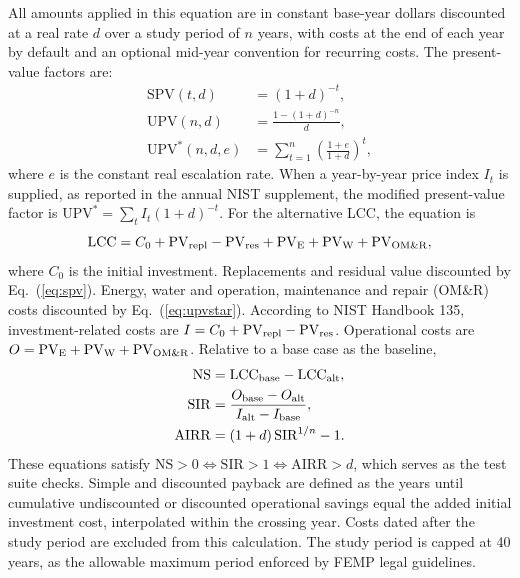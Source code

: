 \documentclass[10pt,twocolumn,letterpaper]{article}
\begin{document}
All amounts applied in this equation are in constant base-year dollars discounted at a real rate $d$ over a study period of $n$ years, with costs at the end of each year by default and an optional mid-year convention for recurring costs. The present-value factors are:
\begin{align}
\mathrm{SPV}(t,d) &= (1+d)^{-t}, \label{eq:spv}\\
\mathrm{UPV}(n,d) &= \frac{1-(1+d)^{-n}}{d}, \label{eq:upv}\\
\mathrm{UPV}^{*}(n,d,e) &= \sum_{t=1}^{n}\left(\frac{1+e}{1+d}\right)^{t}, \label{eq:upvstar}
\end{align}
where $e$ is the constant real escalation rate. When a year-by-year price index $I_t$ is supplied, as reported in the annual NIST supplement, the modified present-value factor is $\mathrm{UPV}^{*}=\sum_t I_t(1+d)^{-t}$. For the alternative LCC, the equation is
\begin{equation}
\mathrm{LCC} = C_0 + \mathrm{PV}_{\rm repl} - \mathrm{PV}_{\rm res} + \mathrm{PV}_{\rm E} + \mathrm{PV}_{\rm W} + \mathrm{PV}_{\rm OM\&R},
\label{eq:lcc}
\end{equation}
where $C_0$ is the initial investment. Replacements and residual value discounted by Eq.~(\ref{eq:spv}). Energy, water and operation, maintenance and repair (OM\&R) costs discounted by Eq.~(\ref{eq:upvstar}). According to NIST Handbook 135, investment-related costs are $I = C_0+\mathrm{PV}_{\rm repl}-\mathrm{PV}_{\rm res}$. Operational costs are $O=\mathrm{PV}_{\rm E}+\mathrm{PV}_{\rm W}+\mathrm{PV}_{\rm OM\&R}$. Relative to a base case as the baseline,
\begin{align}
\mathrm{NS} &= \mathrm{LCC}_{\rm base}-\mathrm{LCC}_{\rm alt}, \label{eq:ns}\\
\mathrm{SIR} &= \frac{O_{\rm base}-O_{\rm alt}}{I_{\rm alt}-I_{\rm base}}, \label{eq:sir}\\
\mathrm{AIRR} &= (1+d)\,\mathrm{SIR}^{1/n}-1. \label{eq:airr}
\end{align}
These equations satisfy $\mathrm{NS}>0 \Leftrightarrow \mathrm{SIR}>1 \Leftrightarrow \mathrm{AIRR}>d$, which serves as the test suite checks. Simple and discounted payback are defined as the years until cumulative undiscounted or discounted operational savings equal the added initial investment cost, interpolated within the crossing year. Costs dated after the study period are excluded from this calculation. The study period is capped at 40 years, as the allowable maximum period enforced by FEMP legal guidelines.
\end{document}
